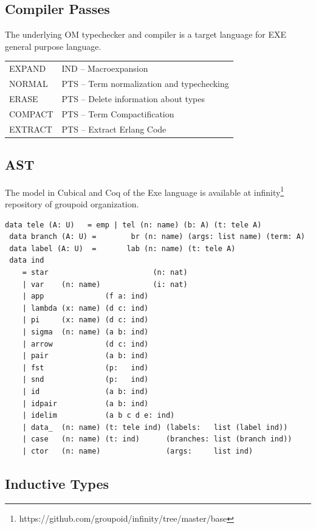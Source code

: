 \documentclass[11pt,oneside]{article}
\begin{document}
   \subsection{Compiler Passes}

   The underlying OM typechecker and compiler is a target language for EXE general purpose language.
   \begin{center}
   \begin{tabular}{ll}
   EXPAND  & IND -- Macroexpansion\\
   NORMAL  & PTS -- Term normalization and typechecking\\
   ERASE   & PTS -- Delete information about types\\
   COMPACT & PTS -- Term Compactification\\
   EXTRACT & PTS -- Extract Erlang Code\\
   \end{tabular}
   \end{center}

\newpage
   \subsection{AST}

    The model in Cubical and Coq of the Exe language is available at
    infinity\footnote{https://github.com/groupoid/infinity/tree/master/base} repository of groupoid organization.

\begin{lstlisting}[mathescape=true]
 data tele (A: U)   = emp | tel (n: name) (b: A) (t: tele A)
 data branch (A: U) =        br (n: name) (args: list name) (term: A)
 data label (A: U)  =       lab (n: name) (t: tele A)
 data ind
    = star                        (n: nat)
    | var    (n: name)            (i: nat)
    | app              (f a: ind)
    | lambda (x: name) (d c: ind)
    | pi     (x: name) (d c: ind)
    | sigma  (n: name) (a b: ind)
    | arrow            (d c: ind)
    | pair             (a b: ind)
    | fst              (p:   ind)
    | snd              (p:   ind)
    | id               (a b: ind)
    | idpair           (a b: ind)
    | idelim           (a b c d e: ind)
    | data_  (n: name) (t: tele ind) (labels:   list (label ind))
    | case   (n: name) (t: ind)      (branches: list (branch ind))
    | ctor   (n: name)               (args:     list ind)
\end{lstlisting}

\newpage
  \subsection{Inductive Types}
\end{document}
